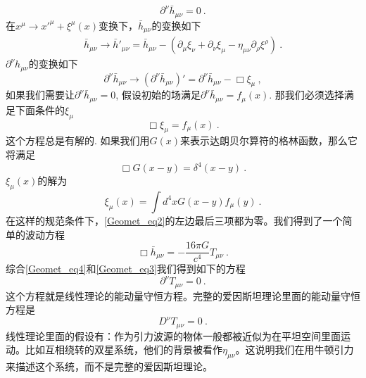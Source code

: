 \begin{equation}\label{Geomet_eq4}
\partial^\nu \bar h_{\mu\nu} = 0 ~. 
\end{equation}
在$x^\mu\rightarrow x'^\mu+\xi^\mu(x)$变换下，$\bar h_{\mu\nu}$的变换如下
\begin{align}
\bar h_{\mu\nu} \rightarrow \bar h'_{\mu\nu} = \bar h_{\mu\nu} - (\partial_\mu\xi_\nu+ \partial_\nu\xi_\mu - \eta_{\mu\nu} \partial_\rho\xi^\rho )~. 
\end{align}
$\partial^\nu h_{\mu\nu}$的变换如下
\begin{equation}
\partial^\nu \bar h_{\mu\nu} \rightarrow (\partial^\nu \bar h_{\mu\nu})' = \partial^\nu \bar h_{\mu\nu} - \Box \xi_\mu ~, 
\end{equation}
如果我们需要让$\partial^\nu \bar h_{\mu\nu} = 0$, 假设初始的场满足$\partial^\nu \bar h_{\mu\nu} = f_\mu (x)$. 那我们必须选择满足下面条件的$\xi_\mu$
\begin{equation}
\Box \xi_\mu = f_\mu (x) ~. 
\end{equation}
这个方程总是有解的. 如果我们用$G(x)$来表示达朗贝尔算符的格林函数，那么它将满足
\begin{equation}
\Box G(x-y) = \delta^4 (x-y) ~.
\end{equation}
$\xi_\mu(x)$的解为
\begin{equation}
\xi_\mu(x) = \int d^4 x G(x-y) f_\mu(y) ~.
\end{equation}
在这样的规范条件下，\autoref{Geomet_eq2}的左边最后三项都为零。我们得到了一个简单的波动方程
\begin{equation}\label{Geomet_eq3}
\Box \bar h_{\mu\nu} = - \frac{16\pi G}{c^4} T_{\mu\nu} ~. 
\end{equation}
综合\autoref{Geomet_eq4}和\autoref{Geomet_eq3}我们得到如下的方程
\begin{equation}
\partial^\nu T_{\mu\nu} = 0~.
\end{equation}
这个方程就是线性理论的能动量守恒方程。完整的爱因斯坦理论里面的能动量守恒方程是
\begin{equation}
D^\nu T_{\mu\nu} = 0 ~.
\end{equation}
线性理论里面的假设有：作为引力波源的物体一般都被近似为在平坦空间里面运动。比如互相绕转的双星系统，他们的背景被看作$\eta_{\mu\nu}$。这说明我们在用牛顿引力来描述这个系统，而不是完整的爱因斯坦理论。
















